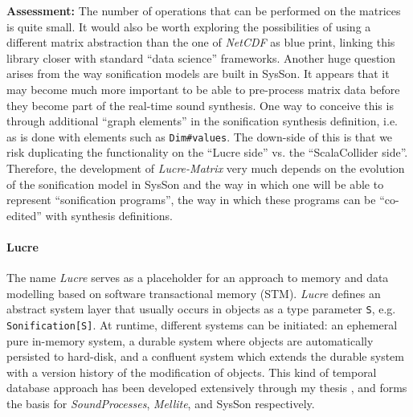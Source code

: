\documentclass[11pt,a4paper]{article}
\newcommand{\software}[1]{\textit{#1}}
\newcommand{\sysson}[0]{SysSon}
\begin{document}
\textbf{Assessment:} The number of operations that can be performed on the matrices is quite small. It would also be worth exploring the possibilities of using a different matrix abstraction than the one of \software{NetCDF} as blue print, linking this library closer with standard ``data science'' frameworks. Another huge question arises from the way sonification models are built in \sysson{}. It appears that it may become much more important to be able to pre-process matrix data before they become part of the real-time sound synthesis. One way to conceive this is through additional ``graph elements'' in the sonification synthesis definition, i.e. as is done with elements such as \verb!Dim#values!. The down-side of this is that we risk duplicating the functionality on the ``Lucre side'' vs. the ``ScalaCollider side''. Therefore, the development of \software{Lucre-Matrix} very much depends on the evolution of the sonification model in \sysson{} and the way in which one will be able to represent ``sonification programs'', the way in which these programs can be ``co-edited'' with synthesis definitions.

\paragraph{Lucre}

The name \software{Lucre} serves as a placeholder for an approach to memory and data modelling based on software transactional memory (STM). \software{Lucre} defines an abstract system layer that usually occurs in objects as a type parameter \verb!S!, e.g. \verb!Sonification[S]!. At runtime, different systems can be initiated: an ephemeral pure in-memory system, a durable system where objects are automatically persisted to hard-disk, and a confluent system which extends the durable system with a version history of the modification of objects. This kind of temporal database approach has been developed extensively through my thesis \autocite{rutz2014tracing}, and forms the basis for \software{SoundProcesses}, \software{Mellite}, and \sysson{} respectively.
\end{document}
